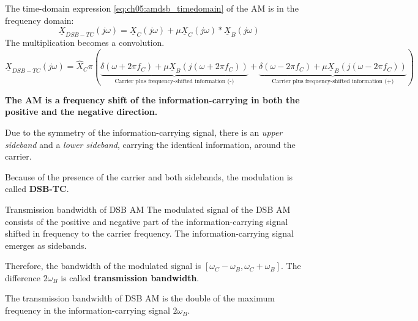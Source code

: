 \begin{refsection}
The time-domain expression \eqref{eq:ch05:amdsb_timedomain} of the \ac{AM} is in the frequency domain:
\begin{equation}
	\underline{X}_{DSB-TC}\left(j\omega\right) = \underline{X}_C\left(j\omega\right) + \mu \underline{X}_C\left(j\omega\right) * \underline{X}_B\left(j\omega\right)
\end{equation}
The multiplication becomes a convolution.
\begin{equation}
	\underline{X}_{DSB-TC}\left(j\omega\right) = \hat{X}_C \pi \left( \underbrace{\delta\left(\omega + 2 \pi f_C \right) + \mu \underline{X}_B\left(j\left(\omega + 2 \pi f_C\right)\right)}_{\text{Carrier plus frequency-shifted information (-)}} + \underbrace{\delta\left(\omega - 2 \pi f_C \right) + \mu \underline{X}_B\left(j\left(\omega - 2 \pi f_C\right)\right)}_{\text{Carrier plus frequency-shifted information (+)}} \right)
\end{equation}

\textbf{The \ac{AM} is a frequency shift of the information-carrying in both the positive and the negative direction.}

Due to the symmetry of the information-carrying signal, there is an \emph{upper sideband} and a \emph{lower sideband}, carrying the identical information, around the carrier.

Because of the presence of the carrier and both sidebands, the modulation is called  \textbf{\acf{DSB-TC}}.

\begin{definition}{Transmission bandwidth of \acs{DSB} \acs{AM}}
	The modulated signal of the \acs{DSB} \acs{AM} consists of the positive and negative part of the information-carrying signal shifted in frequency to the carrier frequency. The information-carrying signal emerges as sidebands.
	
	Therefore, the bandwidth of the modulated signal is $[\omega_C - \omega_B, \omega_C + \omega_B]$. The difference $2 \omega_B$ is called  \textbf{transmission bandwidth}.
\end{definition}

\begin{fact}
	The transmission bandwidth of \acs{DSB} \acs{AM} is the double of the maximum frequency in the information-carrying signal $2 \omega_B$.
\end{fact}


\end{refsection}
